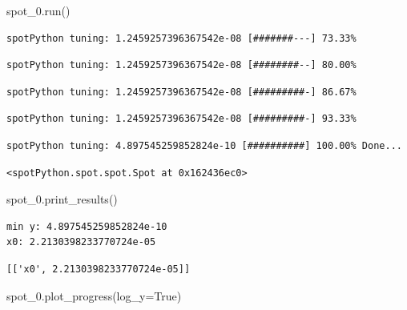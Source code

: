 \documentclass[
  letterpaper,
  DIV=11,
  numbers=noendperiod]{scrreprt}
\newenvironment{Shaded}{\begin{snugshade}}{\end{snugshade}}
\newcommand{\NormalTok}[1]{\textcolor[rgb]{0.00,0.23,0.31}{#1}}
\newcommand{\OperatorTok}[1]{\textcolor[rgb]{0.37,0.37,0.37}{#1}}
\newcommand{\VariableTok}[1]{\textcolor[rgb]{0.07,0.07,0.07}{#1}}
\begin{document}
\begin{Shaded}
\begin{Highlighting}[]
\NormalTok{spot\_0.run()}
\end{Highlighting}
\end{Shaded}

\begin{verbatim}
spotPython tuning: 1.2459257396367542e-08 [#######---] 73.33% 
\end{verbatim}

\begin{verbatim}
spotPython tuning: 1.2459257396367542e-08 [########--] 80.00% 
\end{verbatim}

\begin{verbatim}
spotPython tuning: 1.2459257396367542e-08 [#########-] 86.67% 
\end{verbatim}

\begin{verbatim}
spotPython tuning: 1.2459257396367542e-08 [#########-] 93.33% 
\end{verbatim}

\begin{verbatim}
spotPython tuning: 4.897545259852824e-10 [##########] 100.00% Done...
\end{verbatim}

\begin{verbatim}
<spotPython.spot.spot.Spot at 0x162436ec0>
\end{verbatim}

\begin{Shaded}
\begin{Highlighting}[]
\NormalTok{spot\_0.print\_results()}
\end{Highlighting}
\end{Shaded}

\begin{verbatim}
min y: 4.897545259852824e-10
x0: 2.2130398233770724e-05
\end{verbatim}

\begin{verbatim}
[['x0', 2.2130398233770724e-05]]
\end{verbatim}

\begin{Shaded}
\begin{Highlighting}[]
\NormalTok{spot\_0.plot\_progress(log\_y}\OperatorTok{=}\VariableTok{True}\NormalTok{)}
\end{Highlighting}
\end{Shaded}
\end{document}
